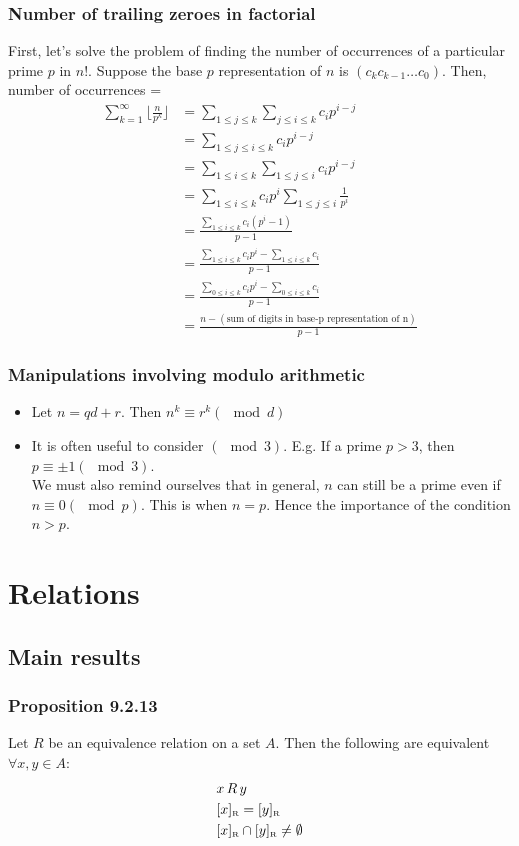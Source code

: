 \documentclass{article}
\begin{document}
\subsubsection{Number of trailing zeroes in factorial}
First, let's solve the problem of finding the number of occurrences of a particular prime $p$ in $n!$.
Suppose the base $p$ representation of $n$ is $(c_kc_{k-1}\dots c_0)$.
Then, number of occurrences = 
\begin{align*}
	\sum_{k=1}^{\infty}\lfloor \frac{n}{p^k} \rfloor
	&=\sum_{1\leq j\leq k}\sum_{j\leq i\leq k}c_ip^{i-j}\\
	&=\sum_{1\leq j\leq i\leq k}c_ip^{i-j}\\
	&=\sum_{1\leq i\leq k}\sum_{1\leq j\leq i}c_ip^{i-j}\\
	&=\sum_{1\leq i\leq k}c_ip^i\sum_{1\leq j\leq i}\frac{1}{p^i}\\
	&=\frac{\sum_{1\leq i\leq k} c_i(p^i-1)}{p-1}\\
	&=\frac{\sum_{1\leq i\leq k} c_ip^i -\sum_{1\leq i\leq k}c_i}{p-1}\\
	&=\frac{\sum_{0\leq i\leq k} c_ip^i -\sum_{0\leq i\leq k}c_i}{p-1}\\
	&=\frac{n-(\text{sum of digits in base-p representation of n})}{p-1}
\end{align*}


\subsubsection{Manipulations involving modulo arithmetic}
\begin{itemize}
	\item Let $n=qd+r$. Then $n^k\equiv r^k (\mod d)$
	\item It is often useful to consider $(\mod 3)$. E.g. If a prime $p>3$, then $p\equiv \pm 1 (\mod 3)$.\\
	 We must also remind ourselves that in general, $n$ can still be a prime even if $n\equiv 0 (\mod p)$. This is when $n=p$. Hence the importance of the condition $n>p$.
\end{itemize}

\section{Relations}
\subsection{Main results}
\subsubsection{Proposition 9.2.13}
Let $R$ be an equivalence relation on a set $A$. Then the following are equivalent $\forall x,y\in A$:
\begin{align*}
    &x\, R\, y\\
    &[x]_\text{\tiny R} = [y]_\text{\tiny R}\\
    &[x]_\text{\tiny R}\cap [y]_\text{\tiny R}\neq \emptyset
\end{align*}
\end{document}
